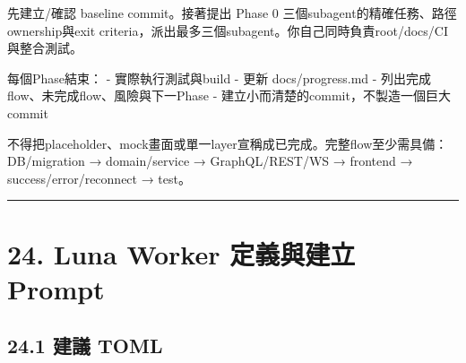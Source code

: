 \documentclass[
  9pt,
  a4paper,
]{article}
\newenvironment{Shaded}{}{}
\newcommand{\NormalTok}[1]{#1}
\begin{document}
\begin{Shaded}
\begin{Highlighting}[]
\NormalTok{先建立/確認 baseline commit。接著提出 Phase 0 三個subagent的精確任務、路徑ownership與exit criteria，派出最多三個subagent。你自己同時負責root/docs/CI與整合測試。}

\NormalTok{每個Phase結束：}
\NormalTok{{-} 實際執行測試與build}
\NormalTok{{-} 更新 \textasciigrave{}docs/progress.md\textasciigrave{}}
\NormalTok{{-} 列出完成flow、未完成flow、風險與下一Phase}
\NormalTok{{-} 建立小而清楚的commit，不製造一個巨大commit}

\NormalTok{不得把placeholder、mock畫面或單一layer宣稱成已完成。完整flow至少需具備：DB/migration → domain/service → GraphQL/REST/WS → frontend → success/error/reconnect → test。}
\end{Highlighting}
\end{Shaded}

\begin{center}\rule{0.5\linewidth}{0.5pt}\end{center}

\section{24. Luna Worker 定義與建立
Prompt}\label{24-luna-worker-ux5b9aux7fa9ux8207ux5efaux7acb-prompt}

\subsection{24.1 建議 TOML}\label{241-ux5efaux8b70-toml}
\end{document}
